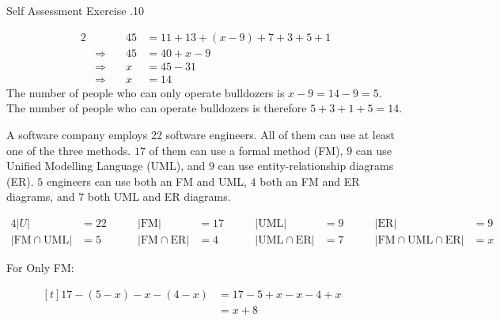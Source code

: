 \documentclass[\main/notes.tex]{subfiles}
\begin{document}
\begin{exercise}{Self Assessment Exercise \thechapter.10}
\begin{questions}
\begin{answer}
\begin{alignat*}{2}
									& &45 &= 11 + 13 + (x - 9) + 7 + 3 + 5 + 1\\
									& \Rightarrow \quad & 45 &= 40 + x - 9\\
									& \Rightarrow \quad & x &= 45 - 31\\
									& \Rightarrow \quad & x &= 14
								\end{alignat*}
								The number of people who can only operate bulldozers is $x - 9 = 14 - 9 = 5$.\\
								The number of people who can operate bulldozers is therefore $5 + 3 + 1 + 5 = 14$.
							\end{answer}
						\item A software company employs 22 software engineers. All of them can use at least one of the three methods. $17$ of them can use a formal method (FM), $9$ can use Unified Modelling Language (UML), and $9$ can use entity-relationship diagrams (ER). $5$ engineers can use both an FM and UML, $4$ both an FM and ER diagrams, and $7$ both UML and ER diagrams.
						\begin{answer}
							\begin{alignat*}{4}
								\left\lvert U\right\rvert &= 22 \qquad & \left\lvert \mathrm{FM}\right\rvert&= 17 \qquad & \left\lvert \mathrm{UML}\right\rvert &= 9 \qquad & \left\lvert \mathrm{ER}\right\rvert &= 9 \\
								\left\lvert \mathrm{FM} \cap \mathrm{UML}\right\rvert &= 5 \qquad & \left\lvert \mathrm{FM} \cap \mathrm{ER}\right\rvert &= 4 \qquad & \left\lvert \mathrm{UML} \cap \mathrm{ER}\right\rvert &= 7 \qquad & \left\lvert \mathrm{FM} \cap \mathrm{UML} \cap \mathrm{ER}\right\rvert &= x  
							\end{alignat*}
							\begin{center}
								\begin{vennthree}[showframe=true, radius=3.5cm, overlap=2.3cm, labelA={FM}, labelB={UML}, labelC={ER}, labelABC={$x$}, labelOnlyAB={$5 - x$}, labelOnlyAC={$4 - x$}, labelOnlyBC={$7 - x$}, labelOnlyA={$x + 8$}, labelOnlyB={$x - 3$}, labelOnlyC={$x - 2$}]
								\end{vennthree}
							\end{center}
							\begin{description}
								\item[For Only FM:] $
									\begin{aligned}[t]
										17 - (5 - x) - x - (4 - x) &= 17 - 5 + x - x - 4 + x\\
										&= x + 8
									\end{aligned} $

\end{description}
\end{answer}
\end{questions}
\end{exercise}
\end{document}
